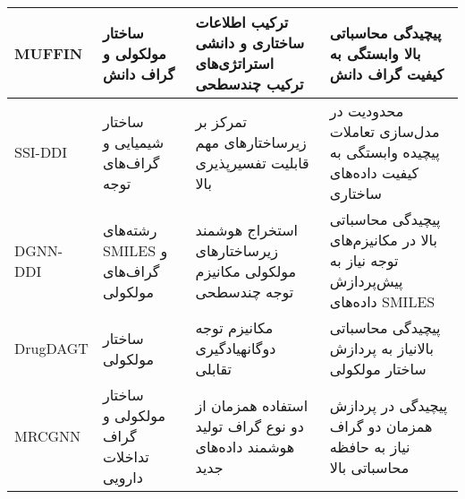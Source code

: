 \begin{table}[!t]
{\begin{tabular}{|P{2.7cm}|P{3.8cm}|P{4.2cm}|P{4.8cm}|}
			\hline
			MUFFIN \cite{ref_muffin2021} & ساختار مولکولی و گراف دانش & ترکیب اطلاعات ساختاری و دانشی \newline استراتژی‌های ترکیب چندسطحی & پیچیدگی محاسباتی بالا \newline وابستگی به کیفیت گراف دانش \\
			\hline
			SSI-DDI \cite{ref_nyamabo2021} & ساختار شیمیایی و گراف‌های توجه & تمرکز بر زیرساختارهای مهم \newline قابلیت تفسیرپذیری بالا & محدودیت در مدل‌سازی تعاملات پیچیده \newline وابستگی به کیفیت داده‌های ساختاری \\
			\hline
			DGNN-DDI \cite{ref_ma2023} & رشته‌های SMILES و گراف‌های مولکولی & استخراج هوشمند زیرساختارهای مولکولی \newline مکانیزم توجه چندسطحی & پیچیدگی محاسباتی بالا در مکانیزم‌های توجه \newline نیاز به پیش‌پردازش داده‌های SMILES \\
			\hline
			DrugDAGT \cite{ref_chen2024} & ساختار مولکولی & مکانیزم توجه دوگانه\newline یادگیری تقابلی & پیچیدگی محاسباتی بالا\newline نیاز به پردازش ساختار مولکولی \\
			\hline
			MRCGNN \cite{ref_mrcgnn2023} & ساختار مولکولی و گراف تداخلات دارویی & استفاده همزمان از دو نوع گراف \newline تولید هوشمند داده‌های جدید & پیچیدگی در پردازش همزمان دو گراف \newline نیاز به حافظه محاسباتی بالا \\

\end{tabular}}
\end{table}
